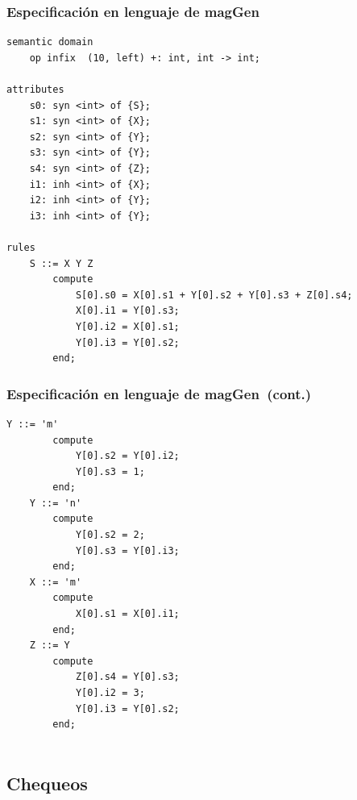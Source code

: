 \documentclass[10pt, xcolor=table, xcolor=dvipsnames]{beamer}
\newcommand{\maggen}{\textbf{magGen}}
\begin{document}
\begin{frame}[fragile]
\frametitle{Especificación en lenguaje de \maggen}

\begin{lstlisting}[basicstyle=\scriptsize, language=specmag, linewidth=10cm]
semantic domain
    op infix  (10, left) +: int, int -> int;

attributes
    s0: syn <int> of {S};
    s1: syn <int> of {X};
    s2: syn <int> of {Y};
    s3: syn <int> of {Y};
    s4: syn <int> of {Z};
    i1: inh <int> of {X};
    i2: inh <int> of {Y};
    i3: inh <int> of {Y};

rules
    S ::= X Y Z
        compute
            S[0].s0 = X[0].s1 + Y[0].s2 + Y[0].s3 + Z[0].s4;
            X[0].i1 = Y[0].s3;
            Y[0].i2 = X[0].s1;
            Y[0].i3 = Y[0].s2;
        end;
\end{lstlisting}
\end{frame}

\begin{frame}[fragile]
\frametitle{Especificación en lenguaje de \maggen\ (cont.)}

\begin{lstlisting}[basicstyle=\scriptsize, language=specmag, linewidth=10cm]
    Y ::= 'm'
        compute
            Y[0].s2 = Y[0].i2;
            Y[0].s3 = 1;
        end;
    Y ::= 'n'
        compute
            Y[0].s2 = 2;
            Y[0].s3 = Y[0].i3;
        end;
    X ::= 'm'
        compute
            X[0].s1 = X[0].i1;
        end;
    Z ::= Y
        compute
            Z[0].s4 = Y[0].s3;
            Y[0].i2 = 3;
            Y[0].i3 = Y[0].s2;
        end;


\end{lstlisting}

\end{frame}

\subsection*{Chequeos}
\end{document}
